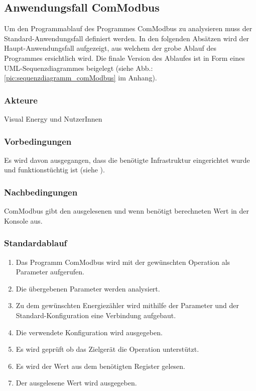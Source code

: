 \documentclass[Bachelorarbeit.tex]{subfiles}
\begin{document}
\subsection{Anwendungsfall ComModbus}
Um den Programmablauf des Programmes ComModbus zu analysieren muss der Standard-Anwendungsfall definiert werden. 
In den folgenden Absätzen wird der Haupt-Anwendungsfall aufgezeigt, aus welchem der grobe Ablauf des Programmes ersichtlich wird. 
Die finale Version des Ablaufes ist in Form eines UML-Sequenzdiagrammes beigelegt (siehe Abb.: \ref{pic:sequenzdiagramm_comModbus} im Anhang).

\subsubsection*{Akteure}
Visual Energy und NutzerInnen

\subsubsection*{Vorbedingungen}
Es wird davon ausgegangen, dass die benötigte Infrastruktur eingerichtet wurde und 
funktionstüchtig ist (siehe ).

\subsubsection*{Nachbedingungen}
ComModbus gibt den ausgelesenen und wenn benötigt berechneten Wert in der 
Konsole aus.

\subsubsection*{Standardablauf}
\begin{enumerate} %
\item Das Programm ComModbus wird mit der gewünschten Operation als
Parameter aufgerufen.
\item Die übergebenen Parameter werden analysiert.
\item \label{uc:3} Zu dem gewünschten Energiezähler wird mithilfe der Parameter und der 
Standard-Konfiguration eine Verbindung aufgebaut.
\item Die verwendete Konfiguration wird ausgegeben.
\item Es wird geprüft ob das Zielgerät die Operation unterstützt.
\item Es wird der Wert aus dem benötigten Register gelesen.
\item \label{uc:7} Der ausgelesene Wert wird ausgegeben.
\end{enumerate}
\end{document}

